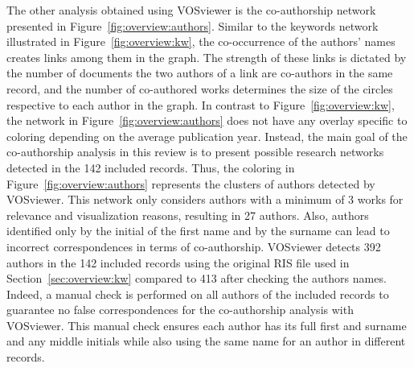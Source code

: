 The other analysis obtained using VOSviewer is the co-authorship network presented in Figure~\ref{fig:overview:authors}. Similar to the keywords network illustrated in Figure~\ref{fig:overview:kw}, the co-occurrence of the authors' names creates links among them in the graph. The strength of these links is dictated by the number of documents the two authors of a link are co-authors in the same record, and the number of co-authored works determines the size of the circles respective to each author in the graph. 
In contrast to Figure~\ref{fig:overview:kw}, the network in Figure~\ref{fig:overview:authors} does not have any overlay specific to coloring depending on the average publication year. Instead, the main goal of the co-authorship analysis in this review is to present possible research networks detected in the 142 included records. Thus, the coloring in Figure~\ref{fig:overview:authors} represents the clusters of authors detected by VOSviewer. This network only considers authors with a minimum of 3 works for relevance and visualization reasons, resulting in 27 authors.
Also, authors identified only by the initial of the first name and by the surname can lead to incorrect correspondences in terms of co-authorship. VOSviewer detects 392 authors in the 142 included records using the original RIS file used in Section~\ref{sec:overview:kw} compared to 413 after checking the authors names. Indeed, a manual check is performed on all authors of the included records to guarantee no false correspondences for the co-authorship analysis with VOSviewer. This manual check ensures each author has its full first and surname and any middle initials while also using the same name for an author in different records.

